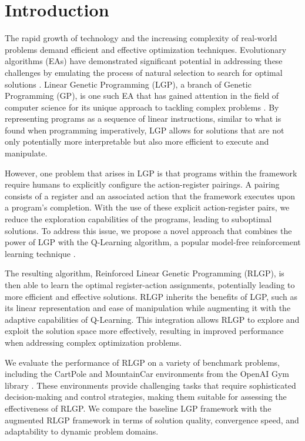\documentclass[12pt, final]{dalcsthesis}
\begin{document}
\mainmatter

\chapter{Introduction}
The rapid growth of technology and the increasing complexity of real-world problems demand efficient and effective optimization techniques. Evolutionary algorithms (EAs) have demonstrated significant potential in addressing these challenges by emulating the process of natural selection to search for optimal solutions \cite{poli08}. Linear Genetic Programming (LGP), a branch of Genetic Programming (GP), is one such EA that has gained attention in the field of computer science for its unique approach to tackling complex problems \cite{song03}. By representing programs as a sequence of linear instructions, similar to what is found when programming imperatively, LGP allows for solutions that are not only potentially more interpretable but also more efficient to execute and manipulate.

However, one problem that arises in LGP is that programs within the framework require humans to explicitly configure the action-register pairings. A pairing consists of a register and an associated action that the framework executes upon a program's completion. With the use of these explicit action-register pairs, we reduce the exploration capabilities of the programs, leading to suboptimal solutions. To address this issue, we propose a novel approach that combines the power of LGP with the Q-Learning algorithm, a popular model-free reinforcement learning technique \cite{sutton2018reinforcement}.

The resulting algorithm, Reinforced Linear Genetic Programming (RLGP), is then able to learn the optimal register-action assignments, potentially leading to more efficient and effective solutions. RLGP inherits the benefits of LGP, such as its linear representation and ease of manipulation while augmenting it with the adaptive capabilities of Q-Learning. This integration allows RLGP to explore and exploit the solution space more effectively, resulting in improved performance when addressing complex optimization problems.

We evaluate the performance of RLGP on a variety of benchmark problems, including the CartPole and MountainCar environments from the OpenAI Gym library \cite{1606.01540}. These environments provide challenging tasks that require sophisticated decision-making and control strategies, making them suitable for assessing the effectiveness of RLGP. We compare the baseline LGP framework with the augmented RLGP framework in terms of solution quality, convergence speed, and adaptability to dynamic problem domains.
\end{document}
